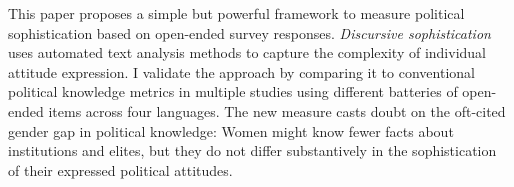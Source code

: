 This paper proposes a simple but powerful framework to measure political sophistication based on open-ended survey responses. \textit{Discursive sophistication} uses automated text analysis methods to capture the complexity of individual attitude expression. I validate the approach by comparing it to conventional political knowledge metrics in multiple studies using different batteries of open-ended items across four languages. The new measure casts doubt on the oft-cited gender gap in political knowledge: Women might know fewer facts about institutions and elites, but they do not differ substantively in the sophistication of their expressed political attitudes.